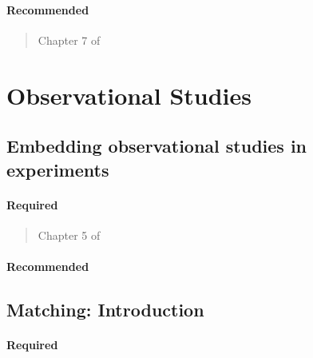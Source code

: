 \documentclass[12pt]{article}
\begin{document}
\paragraph*{Recommended}

\begin{verse} Chapter 7 of  \end{verse}

\begin{verse}  \end{verse}

\begin{verse}  \end{verse}

\section{Observational Studies}

\subsection{Embedding observational studies in experiments}

\paragraph*{Required}

\begin{verse} Chapter 5 of  \end{verse}

\paragraph*{Recommended}

\begin{verse}  \end{verse}

\begin{verse}  \end{verse}

\subsection{Matching: Introduction}

\paragraph*{Required}
\end{document}
